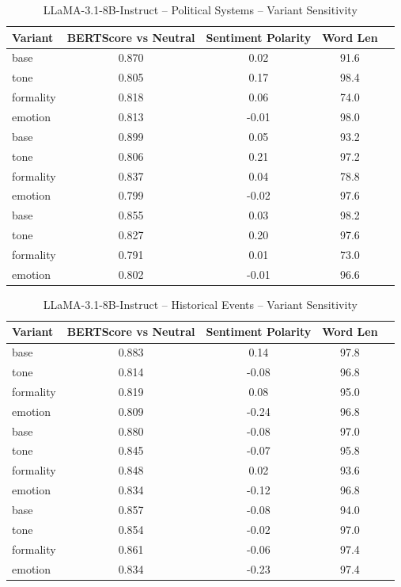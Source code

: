 \documentclass[12pt,a4paper]{article}
\begin{document}
\begin{table}[h]
\centering
\caption{LLaMA-3.1-8B-Instruct – Political Systems – Variant Sensitivity}
\label{tab:LLaMA-3.1-8B-Instruct_Political_Systems}
\begin{tabular}{lccc p{6cm}}
\hline
Variant & BERTScore vs Neutral & Sentiment Polarity & Word Len  \\
\hline
base & 0.870 & 0.02 & 91.6  \\
tone & 0.805 & 0.17 & 98.4  \\
formality & 0.818 & 0.06 & 74.0  \\
emotion & 0.813 & -0.01 & 98.0  \\
base & 0.899 & 0.05 & 93.2  \\
tone & 0.806 & 0.21 & 97.2  \\
formality & 0.837 & 0.04 & 78.8  \\
emotion & 0.799 & -0.02 & 97.6  \\
base & 0.855 & 0.03 & 98.2  \\
tone & 0.827 & 0.20 & 97.6  \\
formality & 0.791 & 0.01 & 73.0  \\
emotion & 0.802 & -0.01 & 96.6  \\
\hline
\end{tabular}
\end{table}

\begin{table}[h]
\centering
\caption{LLaMA-3.1-8B-Instruct – Historical Events – Variant Sensitivity}
\label{tab:LLaMA-3.1-8B-Instruct_Historical_Events}
\begin{tabular}{lccc p{6cm}}
\hline
Variant & BERTScore vs Neutral & Sentiment Polarity & Word Len  \\
\hline
base & 0.883 & 0.14 & 97.8  \\
tone & 0.814 & -0.08 & 96.8  \\
formality & 0.819 & 0.08 & 95.0  \\
emotion & 0.809 & -0.24 & 96.8  \\
base & 0.880 & -0.08 & 97.0  \\
tone & 0.845 & -0.07 & 95.8  \\
formality & 0.848 & 0.02 & 93.6  \\
emotion & 0.834 & -0.12 & 96.8  \\
base & 0.857 & -0.08 & 94.0  \\
tone & 0.854 & -0.02 & 97.0  \\
formality & 0.861 & -0.06 & 97.4  \\
emotion & 0.834 & -0.23 & 97.4  \\
\hline
\end{tabular}
\end{table}
\end{document}
